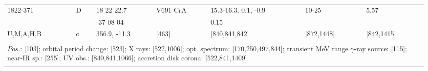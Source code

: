 \documentclass{aa}
\begin{document}
\begin{tabular}{p{2.5cm}p{1cm}p{1.8cm}p{2.3cm}p{3.3cm}p{2.0cm}p{2.2cm}}
\noalign{\smallskip}
1822-371           & D                 & 18 22 22.7           & V691 CrA         &  15.3-16.3, 0.1, -0.9     & 10-25               & 5.57  \\
                            &                     & -37 08 04             &                            & 0.15                                &                          &      \\
U,M,A,H,B         & o                 & 356.9, -11.3         & [463]                  & [840,841,842]               & [872,1448]      & [842,1415]  \\
\\ 
\multicolumn{7}{p{17.5cm}}{
$Pos$.: [103]; orbital period change: [523]; X rays: [522,1006]; opt. spectrum: [170,250,497,844]; transient MeV range 
$\gamma$-ray source: [115]; near-IR sp.: [255]; UV obs.: [840,841,1066]; accretion disk corona: [522,841,1409].}\\
\noalign{\smallskip}
\hline


\end{tabular}
\end{document}
